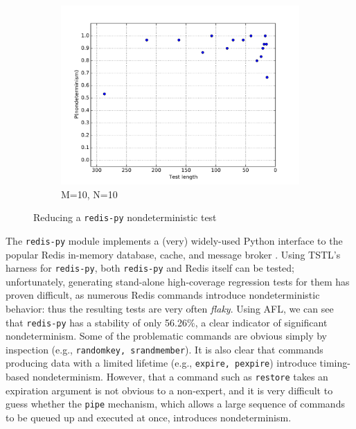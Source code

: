 {\begin{figure}
\begin{subfigure}{0.3\columnwidth}
\includegraphics[width=\columnwidth]{redisforceprep}
\caption{M=10, N=10}
\label{fig:r3}
\end{subfigure}
\caption{Reducing a {\tt redis-py} nondeterministic test}
\end{figure}

The {\tt redis-py} \cite{redispy} module implements a (very) widely-used Python interface
to the popular Redis in-memory database, cache, and
message broker \cite{redis}.  
Using TSTL's harness for {\tt redis-py}, both {\tt redis-py} and Redis
itself can be tested; unfortunately, generating stand-alone
high-coverage regression tests for them
has proven difficult, as numerous Redis commands introduce nondeterministic
behavior:  thus the resulting tests are very often \emph{flaky}.
Using AFL, we can see that {\tt redis-py} has a 
stability of only 56.26\%, a clear indicator of significant nondeterminism. Some
of the problematic commands are obvious simply by inspection (e.g.,
{\tt randomkey, srandmember}). It is also clear that 
commands producing data with a limited lifetime (e.g., {\tt expire,
  pexpire}) introduce timing-based nondeterminism.
However, that a command such as {\tt restore} takes an expiration
argument is not obvious to a non-expert, and it is very
difficult to guess whether the {\tt pipe} mechanism, which allows a
large sequence of commands to be queued up and executed
at once, introduces nondeterminism.

}
